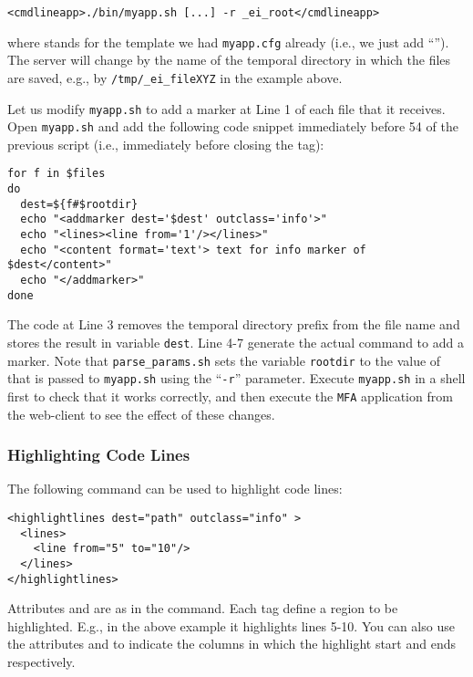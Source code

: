 \medskip
\begin{lstlisting}
<cmdlineapp>./bin/myapp.sh [...] -r _ei_root</cmdlineapp>
\end{lstlisting}

\medskip
\noindent
where \lst{[...]} stands for the template we had \texttt{myapp.cfg}
already (i.e., we just add ``'').
%
The server will change  by the name of the temporal
directory in which the files are saved, e.g., by
\texttt{/tmp/\_ei\_fileXYZ} in the example above.

Let us modify \texttt{myapp.sh} to add a marker at Line 1 of each file
that it receives. Open \texttt{myapp.sh} and add the following code
snippet immediately before 54 of the previous script (i.e.,
immediately before closing the  tag):

\medskip
\begin{lstlisting}[style=script]
for f in $files 
do
  dest=${f#$rootdir}
  echo "<addmarker dest='$dest' outclass='info'>"
  echo "<lines><line from='1'/></lines>"
  echo "<content format='text'> text for info marker of $dest</content>"
  echo "</addmarker>"
done
\end{lstlisting}

\medskip
\noindent
The code at Line 3 removes the temporal directory prefix from the file
name and stores the result in variable \texttt{dest}. Line 4-7
generate the actual command to add a marker.
%
Note that \texttt{parse\_params.sh} sets the variable \texttt{rootdir}
to the value of  that is passed to \texttt{myapp.sh}
using the ``\texttt{-r}'' parameter.
%
Execute \texttt{myapp.sh} in a shell first to check that it works
correctly, and then execute the \texttt{MFA} application from the
web-client to see the effect of these changes.

\subsubsection{Highlighting Code Lines}

The following command can be used to highlight code lines:

\medskip
\begin{lstlisting}
<highlightlines dest="path" outclass="info" > 
  <lines>
    <line from="5" to="10"/>
  </lines>
</highlightlines>
\end{lstlisting}

\medskip
\noindent
Attributes  and  are as in the 
command. Each  tag define a region to be highlighted. E.g.,
in the above example it highlights lines 5-10. You can also use the
attributes  and  to indicate the columns in
which the highlight start and ends respectively.

